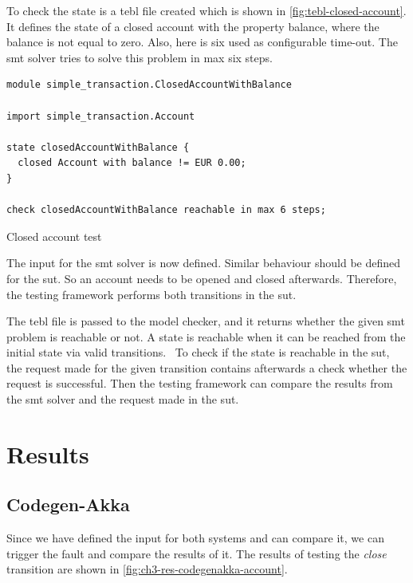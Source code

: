 To check the state is a tebl file created which is shown in
\autoref{fig:tebl-closed-account}. It defines the state of a closed account with
the property balance, where the balance is not equal to zero. Also, here is six
used as configurable time-out. The \gls{smt} solver tries to solve this problem in
max six steps.

\begin{sourcecode}[h!]
\begin{lstlisting}[]
module simple_transaction.ClosedAccountWithBalance

import simple_transaction.Account

state closedAccountWithBalance {
  closed Account with balance != EUR 0.00;
}

check closedAccountWithBalance reachable in max 6 steps;
\end{lstlisting}
\caption{Closed account test}\label{fig:tebl-closed-account}
\end{sourcecode}
\FloatBarrier

The input for the \gls{smt} solver is now defined. Similar behaviour should be defined
for the \gls{sut}. So an account needs to be opened and closed
afterwards. Therefore, the testing framework performs both transitions in the
\gls{sut}.

The tebl file is passed to the model checker, and it returns whether the given
\gls{smt} problem is reachable or not. A state is reachable when it can be reached
from the initial state via valid
transitions.~\cite[p.~4]{stoel_storm_vinju_bosman_2016} To check if the state is
reachable in the \gls{sut}, the request made for the given transition
contains afterwards a check whether the request is successful. Then the testing
framework can compare the results from the \gls{smt} solver and the request made in
the \gls{sut}.

\section{Results}

\subsection{Codegen-Akka}

Since we have defined the input for both systems and can compare it, we
can trigger the fault and compare the results of it. The results of testing the
\textit{close} transition are shown in \autoref{fig:ch3-res-codegenakka-account}.

